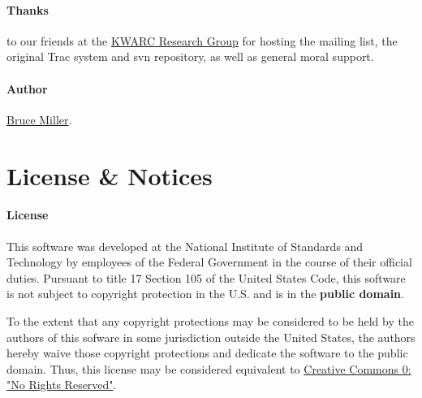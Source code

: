 \documentclass{article}
\begin{document}


\paragraph{Thanks} to our friends at
the \href{http://kwarc.info}{KWARC Research Group}
for hosting the mailing list, the original Trac system and svn repository,
as well as general moral support.

\paragraph{Author} \href{mailto:bruce.miller@nist.gov}{Bruce Miller}.
\section{License \& Notices}\label{notices}

\paragraph{License}
  This software was developed at the National Institute of Standards and
Technology by employees of the Federal Government in the course of their
official duties. Pursuant to title 17 Section 105 of the United States
Code, this software is not subject to copyright protection in the U.S.
and is in the \textbf{public domain}.

To the extent that any copyright protections may be considered to be held
by the authors of this sofware in some jurisdiction outside the United
States, the authors hereby waive those copyright protections and dedicate
the software to the public domain. Thus, this license may be considered equivalent to
\href{http://creativecommons.org/about/cc0}{Creative Commons 0: "No Rights Reserved"}.
\end{document}
